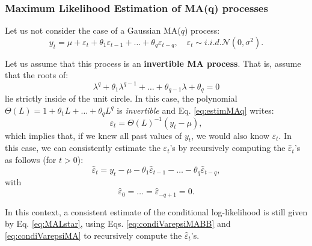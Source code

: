 \documentclass[
  11pt,
]{book}
\theoremstyle{definition}
\theoremstyle{definition}
\theoremstyle{definition}
\theoremstyle{definition}
\theoremstyle{remark}
\begin{document}
\subsubsection{Maximum Likelihood Estimation of MA(q) processes}\label{estimMAq}

Let us not consider the case of a Gaussian MA(\(q\)) process:
\begin{equation}
y_t = \mu + \varepsilon_t + \theta_1 \varepsilon_{t-1} + \dots + \theta_q \varepsilon_{t-q} , \quad \varepsilon_t \sim i.i.d.\mathcal{N}(0,\sigma^2). \label{eq:estimMAq}
\end{equation}

Let us assume that this process is an \textbf{invertible MA process}. That is, assume that the roots of:
\begin{equation}
\lambda^q + \theta_1 \lambda^{q-1} + \dots + \theta_{q-1} \lambda + \theta_q = 0 \label{eq:invertible}
\end{equation}
lie strictly inside of the unit circle. In this case, the polynomial \(\Theta(L)=1 + \theta_1 L + \dots + \theta_q L^q\) is \emph{invertible} and Eq. \eqref{eq:estimMAq} writes:
\[
\varepsilon_t = \Theta(L)^{-1}(y_t - \mu),
\]
which implies that, if we knew all past values of \(y_t\), we would also know \(\varepsilon_t\). In this case, we can consistently estimate the \(\varepsilon_t\)'s by recursively computing the \(\hat\varepsilon_t\)'s as follows (for \(t>0\)):
\begin{equation}
\hat\varepsilon_t = y_t - \mu - \theta_1 \hat\varepsilon_{t-1} - \dots  - \theta_q \hat\varepsilon_{t-q},\label{eq:condiVarepsiMABB}
\end{equation}
with
\begin{equation}
\hat\varepsilon_{0}=\dots=\hat\varepsilon_{-q+1}=0.\label{eq:condiVarepsiMA}
\end{equation}

In this context, a consistent estimate of the conditional log-likelihood is still given by Eq. \eqref{eq:MALstar}, using Eqs. \eqref{eq:condiVarepsiMABB} and \eqref{eq:condiVarepsiMA} to recursively compute the \(\hat\varepsilon_t\)'s.
\end{document}
